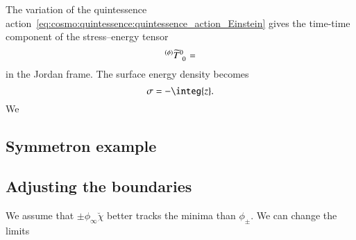 







The variation of the quintessence action~\cref{eq:cosmo:quintessence:quintessence_action_Einstein} gives the time-time component of the stress--energy tensor
\begin{equation}
    {}^{(\phi)}\widetilde{T}\indices{^0_0} = 
\end{equation}
in the Jordan frame. %
The surface energy density becomes
\begin{equation}
    \sigma =- \integ{z}.
\end{equation}
We 


\subsection{Symmetron example}
    


\subsection{Adjusting the boundaries}
    We assume that $\pm\phi_\infty\breve{\chi}$ better tracks the minima than $\phi_\pm$. We can change the limits 